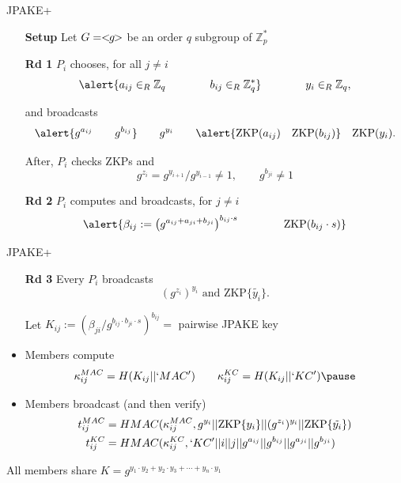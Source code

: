 \documentclass{beamer}
\theoremstyle{definition}
\begin{document}
\begin{frame}{JPAKE+}
    \begin{itemize}
        \item[\textbf{Setup}]  Let $G = <\hspace{-.05in} g \hspace{-.05in} >$ be an order $q$ subgroup of $\mathbb{Z}_p^*$
        \item[] \pause
        \item[\textbf{Rd 1}] $P_i$ chooses, for all $j \neq i$
        \[ \alert{a_{ij} \in_R \mathbb{Z}_q \qquad\qquad b_{ij} \in_R \mathbb{Z}_q^*} \qquad\qquad y_i \in_R \mathbb{Z}_q, \]
        \item[] and broadcasts
        \[ \alert{g^{a_{ij}} \qquad g^{b_{ij}}} \qquad g^{y_i} \qquad \alert{\text{ZKP}(a_{ij}) \quad \text{ZKP}(b_{ij})} \quad \text{ZKP}(y_{i}). \]
        \item[] After, $P_i$ checks ZKPs and
        \[ g^{z_i} = g^{y_{i+1}}/ g^{y_{i-1}} \neq 1, \qquad g^{b_{ji}} \neq 1\] \pause
        \item[\textbf{Rd 2}]  $P_i$ computes and broadcasts, for $j \neq i$
        \[ \alert{\beta_{ij} := \left(g^{a_{ij} + a_{ji} + b_{ji}}\right)^{b_{ij}\cdot s}  \qquad \qquad \text{ZKP}(b_{ij}\cdot s)} \]
    \end{itemize}
\end{frame}

\begin{frame}{JPAKE+}
    \begin{itemize}
        \item[\textbf{Rd 3}] Every $P_i$ broadcasts
          \[ (g^{z_i})^{y_i} \text{ and } \text{ZKP}\{\tilde{y_i}\}. \]
        \item[] Let \alert{$K_{ij} := (\beta_{ji}/g^{b_{ij} \cdot b_{ji} \cdot s})^{b_{ij}} = $ pairwise JPAKE key} \pause
        \item[]
        \item Members compute
          \[ \kappa_{ij}^{MAC} = H(K_{ij} || `MAC') \qquad \kappa_{ij}^{KC} = H(K_{ij} || `KC') \pause \] 
        \item Members broadcast (and then verify)
        \begin{align*}
        t_{ij}^{MAC} &= HMAC(\kappa_{ij}^{MAC},  g^{y_i} || \text{ZKP}\{y_i\} || (g^{z_i})^{y_i} || \text{ZKP}\{\tilde{y_i}\})\\
        t_{ij}^{KC} &= HMAC(\kappa_{ij}^{KC}, `KC' || i || j || g^{a_{ij}} || g^{b_{ij}} || g^{a_{ji}} || g^{b_{ji}})
        \end{align*}
    \end{itemize}
    
    All members share $K = g^{y_1 \cdot y_2 + y_2 \cdot y_3 + \cdots + y_n \cdot y_1}$
\end{frame}
\end{document}
